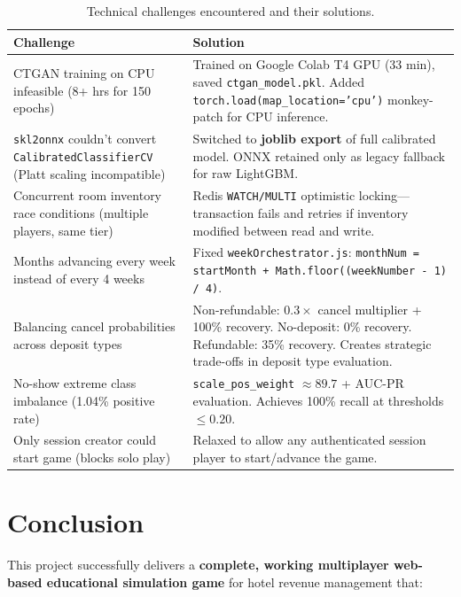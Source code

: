 \documentclass[12pt,a4paper,openany]{report}
\begin{document}
\begin{table}[htbp]
\centering
\caption{Technical challenges encountered and their solutions.}
\label{tab:challenges}
\small
\begin{tabular}{@{}p{3.8cm}p{10.2cm}@{}}
\toprule
\textbf{Challenge} & \textbf{Solution} \\
\midrule
CTGAN training on CPU infeasible (8+ hrs for 150 epochs) & Trained on Google Colab T4 GPU (33 min), saved \texttt{ctgan\_model.pkl}. Added \texttt{torch.load(map\_location='cpu')} monkey-patch for CPU inference. \\
\midrule
\texttt{skl2onnx} couldn't convert \texttt{CalibratedClassifierCV} (Platt scaling incompatible) & Switched to \textbf{joblib export} of full calibrated model. ONNX retained only as legacy fallback for raw LightGBM. \\
\midrule
Concurrent room inventory race conditions (multiple players, same tier) & Redis \texttt{WATCH/MULTI} optimistic locking---transaction fails and retries if inventory modified between read and write. \\
\midrule
Months advancing every week instead of every 4 weeks & Fixed \texttt{weekOrchestrator.js}: \texttt{monthNum = startMonth + Math.floor((weekNumber - 1) / 4)}. \\
\midrule
Balancing cancel probabilities across deposit types & Non-refundable: $0.3\times$ cancel multiplier + 100\% recovery. No-deposit: 0\% recovery. Refundable: 35\% recovery. Creates strategic trade-offs in deposit type evaluation. \\
\midrule
No-show extreme class imbalance (1.04\% positive rate) & \texttt{scale\_pos\_weight} $\approx 89.7$ + AUC-PR evaluation. Achieves 100\% recall at thresholds $\leq 0.20$. \\
\midrule
Only session creator could start game (blocks solo play) & Relaxed to allow any authenticated session player to start/advance the game. \\
\bottomrule
\end{tabular}
\end{table}

\chapter{Conclusion}
\label{ch:conclusion}

This project successfully delivers a \textbf{complete, working multiplayer web-based educational simulation game} for hotel revenue management that:
\end{document}
